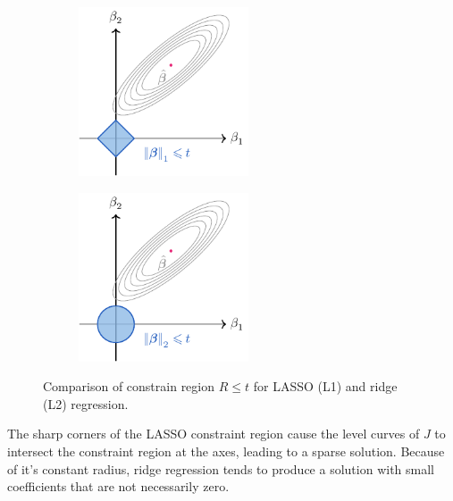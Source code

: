 \documentclass{article}
\begin{document}
\begin{figure}[H]
    \centering
    \begin{subfigure}[t]{0.48\linewidth}
        \centering
        \includegraphics[height = 5cm]{figures/lasso.pdf}
    \end{subfigure}
    \begin{subfigure}[t]{0.48\linewidth}
        \centering
        \includegraphics[height = 5cm]{figures/ridge.pdf}
    \end{subfigure}
    \caption{Comparison of constrain region \(R \leqslant t\) for LASSO (L1) and ridge (L2) regression.} %
\end{figure}
The sharp corners of the LASSO constraint region cause the level curves
of \(J\) to intersect the constraint region at the axes, leading to a
sparse solution. Because of it's constant radius, ridge regression tends
to produce a solution with small coefficients that are not necessarily
zero.
\newpage
\end{document}
